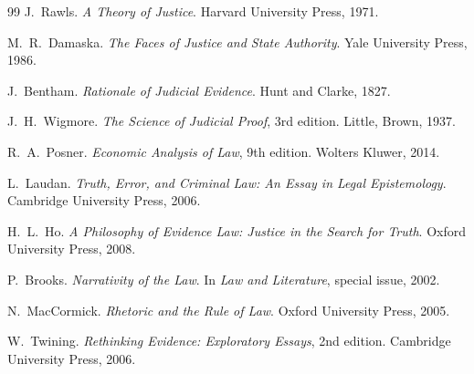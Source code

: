 \documentclass[11pt,a4paper]{article}
\theoremstyle{remark}
\begin{document}
\begin{thebibliography}{99}
J.~Rawls.
\newblock \emph{A Theory of Justice}.
\newblock Harvard University Press, 1971.

M.~R.~Damaska.
\newblock \emph{The Faces of Justice and State Authority}.
\newblock Yale University Press, 1986.

J.~Bentham.
\newblock \emph{Rationale of Judicial Evidence}.
\newblock Hunt and Clarke, 1827.

J.~H.~Wigmore.
\newblock \emph{The Science of Judicial Proof}, 3rd edition.
\newblock Little, Brown, 1937.

R.~A.~Posner.
\newblock \emph{Economic Analysis of Law}, 9th edition.
\newblock Wolters Kluwer, 2014.

L.~Laudan.
\newblock \emph{Truth, Error, and Criminal Law: An Essay in Legal Epistemology}.
\newblock Cambridge University Press, 2006.

H.~L.~Ho.
\newblock \emph{A Philosophy of Evidence Law: Justice in the Search for Truth}.
\newblock Oxford University Press, 2008.

P.~Brooks.
\newblock \emph{Narrativity of the Law}.
\newblock In \emph{Law and Literature}, special issue, 2002.

N.~MacCormick.
\newblock \emph{Rhetoric and the Rule of Law}.
\newblock Oxford University Press, 2005.

W.~Twining.
\newblock \emph{Rethinking Evidence: Exploratory Essays}, 2nd edition.
\newblock Cambridge University Press, 2006.

\end{thebibliography}
\end{document}
